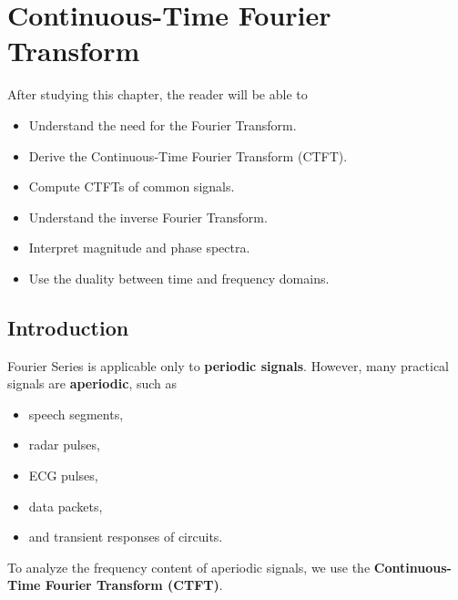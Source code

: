 
\chapter{Continuous-Time Fourier Transform}

\begin{tcolorbox}[colback=blue!5!white,colframe=blue!70!black,title=Learning Objectives]

After studying this chapter, the reader will be able to

\begin{itemize}
\item Understand the need for the Fourier Transform.
\item Derive the Continuous-Time Fourier Transform (CTFT).
\item Compute CTFTs of common signals.
\item Understand the inverse Fourier Transform.
\item Interpret magnitude and phase spectra.
\item Use the duality between time and frequency domains.
\end{itemize}

\end{tcolorbox}


\section{Introduction}

Fourier Series is applicable only to \textbf{periodic signals}. However, many
practical signals are \textbf{aperiodic}, such as

\begin{itemize}
\item speech segments,
\item radar pulses,
\item ECG pulses,
\item data packets,
\item and transient responses of circuits.
\end{itemize}

To analyze the frequency content of aperiodic signals, we use the
\textbf{Continuous-Time Fourier Transform (CTFT)}.

